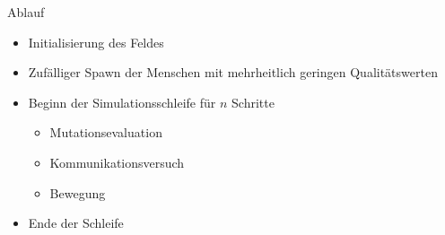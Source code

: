 \begin{frame} {Ablauf}
	\begin{itemize}
		\item Initialisierung des Feldes
		\item Zufälliger Spawn der Menschen mit mehrheitlich geringen Qualitätswerten
		\item Beginn der Simulationsschleife für \(n\) Schritte
		\begin{itemize}
			\item Mutationsevaluation
			\item Kommunikationsversuch
			\item Bewegung
		\end{itemize}
		\item Ende der Schleife
	\end{itemize}
\end{frame}